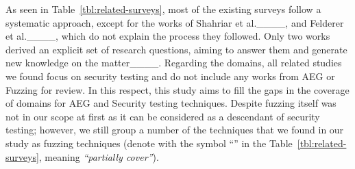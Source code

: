 As seen in Table~\ref{tbl:related-surveys}, most of the existing surveys follow a systematic approach, except for the works of Shahriar et al.____, and Felderer et al.____, which do not explain the process they followed.
Only two works derived an explicit set of research questions, aiming to answer them and generate new knowledge on the matter____.
{}
{}
Regarding the domains, all related studies we found focus on security testing and do not include any works from AEG or Fuzzing for review. 
%
In this respect, this study aims to fill the gaps in the coverage of domains for AEG and Security testing techniques.
{}
{}
Despite fuzzing itself was not in our scope at first as it can be considered as a descendant of security testing; however, we still group a number of the techniques that we found in our study as fuzzing techniques (denote with the symbol ``'' in the Table~\ref{tbl:related-surveys}, meaning \textit{``partially cover''}).